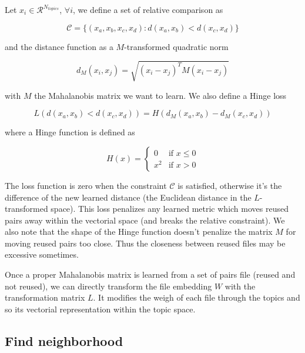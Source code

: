 \documentclass[a4paper]{article}
\begin{document}
	Let $x_i \in \mathcal{R}^{N_{topics}}$, $\forall i$, we define a set of relative comparison as
	
	\begin{equation}
		\mathcal{C} = \{(x_{a}, x_{b}, x_{c}, x_{d}):d(x_{a}, x_{b}) < d(x_{c}, x_{d})\}
	\end{equation}
	
	and the distance function as a $M$-transformed quadratic norm
	
	\begin{equation}
		d_{M}(x_{i}, x_{j}) = \sqrt{(x_{i} - x_{j})^{T}M(x_{i} - x_{j})}
	\end{equation}
	
	with $M$ the Mahalanobis matrix we want to learn. We also define a Hinge loss
	
	\begin{equation}
		L(d(x_{a}, x_{b}) < d(x_{c}, x_{d})) = H(d_{M}(x_{a}, x_{b}) - d_{M}(x_{c}, x_{d}))
	\end{equation}
	
	where a Hinge function is defined as
	
	\begin{equation}
		H(x) = \begin{cases}
				0 & \mbox{if } x \leq 0 \\
				x^{2} & \mbox{if } x > 0
			   \end{cases}
	\end{equation}
	
	The loss function is zero when the constraint $\mathcal{C}$ is satisfied, otherwise it's the difference of the new learned distance (the Euclidean distance in the $L$-transformed space). This loss penalizes any learned metric which moves reused pairs away within the vectorial space (and breaks the relative constraint). We also note that the shape of the Hinge function doesn't penalize the matrix $M$ for moving reused pairs too close. Thus the closeness between reused files may be excessive sometimes.
	
	Once a proper Mahalanobis matrix is learned from a set of pairs file (reused and not reused), we can directly transform the file embedding $W$ with the transformation matrix $L$. It modifies the weigh of each file through the topics and so its vectorial representation within the topic space.
	
	\subsection{Find neighborhood}
	
\end{document}
